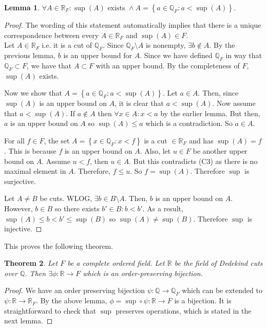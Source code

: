\documentclass{article}
\newcommand\R{\ensuremath{\mathbb{R}}}
\newcommand\Q{\ensuremath{\mathbb{Q}}}
\newtheorem{theorem}{Theorem}[section]
\newtheorem{lemma}[theorem]{Lemma}
\theoremstyle{definition}
\theoremstyle{remark}
\theoremstyle{plain}
\begin{document}
\begin{lemma}
    \(\forall A \in \R_F: \sup(A) \text{ exists } \land A = \left\{ a \in \Q_F: a < \sup(A)\right\}\).
\end{lemma}
\begin{proof}
    The wording of this statement automatically implies that there is a unique correspondence between every \(A \in \R_F\) and \(\sup(A) \in F\).\\
    Let \(A \in \R_F\) i.e. it is a cut of \(\Q_F\). Since \(\Q_F \setminus A\) is nonempty, \(\exists b \notin A\). By the previous lemma, \(b\) 
    is an upper bound for \(A\). Since we have defined \(\Q_F\) in way that \(\Q_F \subset F\), we have that \(A \subset F\) with an upper bound. By the completeness of \(F\), \(\sup(A)\) exists. 

    Now we show that \(A = \left\{ a \in \Q_F: a < \sup(A) \right\}\). Let \(a \in A\). Then, since \(\sup(A)\) is an upper bound on \(A\), 
    it is clear that \(a < \sup(A)\). Now assume that \(a < \sup(A)\). If \(a \notin A\) then \(\forall x \in A: x < a\) by the earlier lemma.
    But then, \(a\) is an upper bound on \(A\) so \(\sup(A) \leq a\) which is a contradiction. So \(a \in A\). 

    For all \(f \in F\), the set \(A = \left\{ x \in \Q_F: x < f \right\}\) is a cut \(\in \R_F\) and has \(\sup(A) = f\). This is because \(f\) is an upper bound on \(A\). 
    Also, let \(u \in F\) be another upper bound on \(A\). Assume \(u < f\), then \( u\in A\). But this contradicts (C3) as there is no maximal element in \(A\). 
    Therefore, \(f \leq u\). So \(f = \sup(A)\). Therefore \(\sup\) is surjective. 

    Let \(A \neq B\) be cuts. WLOG, \(\exists b \in B\setminus A \). Then, \(b\) is an upper bound on \(A\). However, \(b \in B\) so there exists \(b' \in B: b < b'\).
    As a result, \(\sup(A) \leq b < b' \leq \sup(B)\) so \(\sup(A) \neq \sup(B)\). Therefore \(\sup\) is injective.
\end{proof}

This proves the following theorem. 

\begin{theorem}
    Let \(F\) be a complete ordered field. Let \(\R\) be the field of Dedekind cuts over \(\Q\). Then \(\exists \phi: \R \to F\) which is an order-preserving bijection. 
\end{theorem}
\begin{proof}
    We have an order preserving bijection \(\psi: \Q \to \Q_F\) which can be extended to \(\psi: \R \to \R_F\). By the above lemma, \(\phi = \sup \circ \psi : \R \to F\) 
    is a bijection. It is straightforward to check that \(\sup\) preserves operations, which is stated in the next lemma.
\end{proof}
\end{document}
